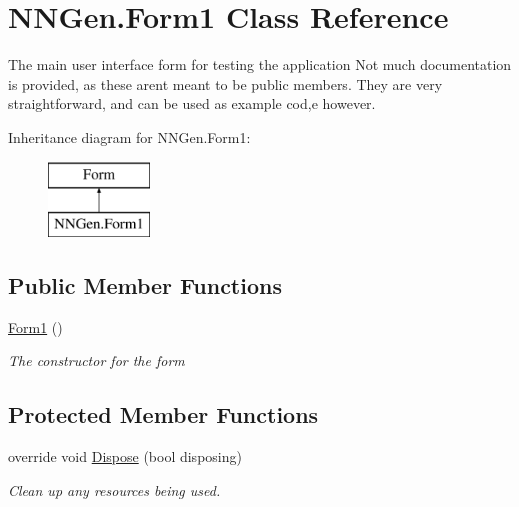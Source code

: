 \hypertarget{class_n_n_gen_1_1_form1}{}\section{N\+N\+Gen.\+Form1 Class Reference}
\label{class_n_n_gen_1_1_form1}


The main user interface form for testing the application Not much documentation is provided, as these aren\textquotesingle{}t meant to be public members. They are very straightforward, and can be used as example cod,e however.  


Inheritance diagram for N\+N\+Gen.\+Form1\+:\begin{figure}[H]
\begin{center}
\leavevmode
\includegraphics[height=2.000000cm]{class_n_n_gen_1_1_form1}
\end{center}
\end{figure}
\subsection*{Public Member Functions}
\begin{DoxyCompactItemize}
\item 
\hyperlink{class_n_n_gen_1_1_form1_ad7a3dddfefd46943cee8221a00e78a2d}{Form1} ()
\begin{DoxyCompactList}\small\item\em The constructor for the form \end{DoxyCompactList}\end{DoxyCompactItemize}
\subsection*{Protected Member Functions}
\begin{DoxyCompactItemize}
\item 
override void \hyperlink{class_n_n_gen_1_1_form1_a0c2f9c40cfcc62a50bfee5d9616845d4}{Dispose} (bool disposing)
\begin{DoxyCompactList}\small\item\em Clean up any resources being used. \end{DoxyCompactList}\end{DoxyCompactItemize}


